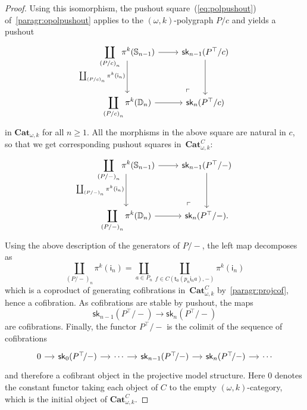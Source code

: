\documentclass[reqno]{amsart}
\theoremstyle{plain}
\theoremstyle{definition}
\theoremstyle{remark}
\newcommand{\pair}[2]{(#1,#2)}       %
\newcommand{\target}{\mathsf{t}} %
\newcommand{\geninc}{\mathsf{i}} %
\newcommand{\homset}[3]{#1(#2,#3)} %
\newcommand{\tr}[2]{#1/#2} %
\newcommand{\ctg}[1]{\mathbf{#1}}  %
\newcommand{\Cat}{\ctg{Cat}}   %
\newcommand{\opCat}[1]{\Cat_{\omega,#1}} %
\newcommand{\funopCat}[2]{\Cat_{\omega,#1}^{#2}} %
\newcommand{\functor}[1]{\mathsf{#1}} %
\newcommand{\pifun}[2]{\functor{\pi}_{#2}^{#1}}%
\newcommand{\skl}[1]{\functor{sk}_{#1}}%
\newcommand{\opifun}[1]{\pifun{#1}{}}%
\newcommand{\tge}[1]{\target_{#1}} %
\newcommand{\frgp}[1]{#1^\top} %
\newcommand{\ook}[1]{\ensuremath{\pair{\omega}{#1}}}
\newcommand{\gni}[1]{\geninc_{#1}}%
\newcommand{\Sph}[1]{\mathbb{S}_{#1}} %
\newcommand{\Dsk}[1]{\mathbb{D}_{#1}} %
\newcommand{\gcof}[1]{\functor{i}_{#1}} %
\begin{document}
\begin{proof}
   Using this isomorphism, the pushout square~(\ref{eq:polpushout})
   of~\ref{paragr:opolpushout} applies to the \ook k-polygraph $\tr
   Pc$ and yields a pushout
  \[
    \begin{tikzcd}[row sep=large]
           \displaystyle\coprod_{{(\tr Pc)}_{n}} \opifun k (\Sph{n-1})
     \ar[d,"\coprod_{{(\tr Pc)}_{n}}\opifun
     k(\gcof{n})"',start anchor={[yshift=2.8ex]}]\ar[r]&\skl{n-1}(\tr{\frgp{P}}{c})\ar[d]\\
           \displaystyle\coprod_{{(\tr Pc)}_{n}}\opifun k(\Dsk{n})\ar[r]& \skl n{(\tr{\frgp{P}}{c})}
           \ar[from=1-1,to=2-2,phantom,"\ulcorner",very near end]
         \end{tikzcd}
  \]
  in $\opCat k$ for all $n\geq 1$. All the morphisms in the above
  square are natural in $c$, so that we get corresponding pushout
  squares in~$\funopCat{k}{C}$:
    \[
    \begin{tikzcd}[row sep=large]
           \displaystyle\coprod_{{(\tr P-)}_{n}} \opifun k (\Sph{n-1})
     \ar[d,"\coprod_{{(\tr P-)}_{n}}\opifun
     k(\gcof{n})"',start anchor={[yshift=2.8ex]}]\ar[r]&\skl{n-1}(\tr{\frgp{P}}{-})\ar[d]\\
           \displaystyle\coprod_{{(\tr P-)}_{n}}\opifun k(\Dsk{n})\ar[r]& \skl n{(\tr{\frgp{P}}{-})}.
           \ar[from=1-1,to=2-2,phantom,"\ulcorner",very near end]
         \end{tikzcd}
  \]
      Using the above description of the generators of $\tr P-$, the left
  map decomposes as
  \[
    \coprod_{{(\tr P-)}_{n}}\opifun k(\gcof {n})=\coprod_{a\in
      P_n}\coprod_{f\in\homset{C}{\tge 0(p_n\gni na)}{-}}\opifun k(\gcof {n})
  \]
  which is a coproduct of generating cofibrations
  in~$\funopCat{k}{C}$ by~\ref{paragr:projcof}, hence a cofibration. As cofibrations are
  stable by pushout, the maps
  \[
    \skl{n-1}(\tr{\frgp{P}\!}{-})\to \skl n(\tr{\frgp{P}\!}{-})
\]
   are cofibrations. Finally, the functor
  $\tr{\frgp{P}\!}{-}$ is the colimit of the sequence of cofibrations
  \[
    \begin{tikzcd}[column sep=small]
      0\ar[r] &\skl 0(\tr{\frgp{P}\!}{-})\ar[r] &\cdots\ar[r]
      &\skl{n-1}(\tr{\frgp{P}\!}{-})\ar[r]&
      \skl n(\tr{\frgp{P}\!}{-})\ar[r] &\cdots
    \end{tikzcd}
  \]
  and therefore a cofibrant object in the projective model
  structure. Here $0$ denotes the constant functor taking each object
  of $C$ to the empty \ook k-category, which is the initial object of
  $\funopCat{k}{C}$.
\end{proof}
\end{document}
